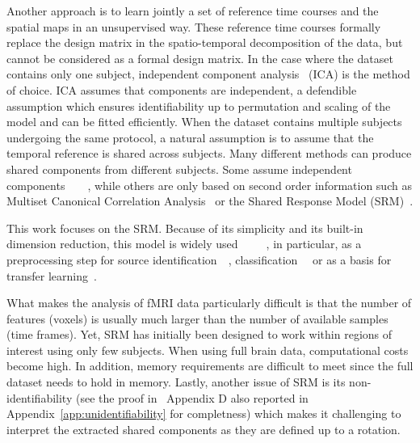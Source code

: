 \documentclass{article}
\begin{document}
Another approach is to learn jointly a set of reference time courses  and the spatial maps in
an unsupervised way.
%
These reference time courses formally replace the design matrix in the
spatio-temporal decomposition of the data, but cannot be considered as
a formal design matrix.
%
In the case where the dataset contains only one subject,
independent component analysis~\cite{jutten1991blind} (ICA) is the method of choice.
%
ICA assumes that components are independent, a defendible assumption
which ensures identifiability up to permutation and scaling of the
model and can be fitted efficiently.
%
When the dataset contains multiple subjects undergoing the same
protocol, a natural assumption is to assume that the temporal reference is
shared across subjects.
%
Many different methods can produce shared components from different
subjects.
%
Some assume independent
components~\cite{richard2021model}~\cite{richard2020modeling}~\cite{varoquaux2009canica}~\cite{calhoun2001method},
while others are only based on second order information such as
Multiset Canonical Correlation Analysis~\cite{via2011joint} or the
Shared Response Model (SRM)~\cite{chen2015reduced}.
%

This work focuses on the SRM. Because of its simplicity and its
built-in dimension reduction, this model is widely
used~\cite{baldassano2017discovering}~\cite{cohen2017computational}~\cite{baldassano2018representation}~\cite{jolly2020custom}~\cite{lee2021anticipation},
in particular, as a preprocessing step for source
identification~\cite{richard2021model}~\cite{richard2020modeling},
classification~\cite{turek2018capturing}~\cite{chen2017shared}\cite{zhang2016searchlight}
or as a basis for transfer learning~\cite{zhang2018transfer}.


What makes the analysis of fMRI data particularly difficult is that
the number of features (voxels) is usually much
larger than the number of available samples (time frames).
Yet, SRM has initially been designed to work within regions of interest using
only few subjects.
%
When using full brain data, computational costs become
high.
%
In addition, memory requirements are difficult to meet since the full dataset
needs to hold in memory.
%
Lastly, another issue of SRM is its non-identifiability (see the proof
in~\cite{richard2020modeling} Appendix D also reported in Appendix~\ref{app:unidentifiability} for completness) which makes it challenging to
interpret the extracted shared components as they are defined up to a rotation.
%
\end{document}
